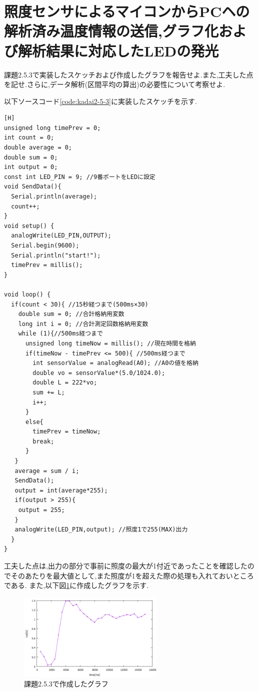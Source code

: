 \documentclass{jarticle}
\begin{document}
\section{照度センサによるマイコンからPCヘの解析済み温度情報の送信,グラフ化および解析結果に対応したLEDの発光}
課題2.5.3で実装したスケッチおよび作成したグラフを報告せよ.また,工夫した点を記せ.さらに,データ解析(区間平均の算出)の必要性について考察せよ.

以下ソースコード\ref{code:kadai2-5-3}に実装したスケッチを示す.
\begin{lstlisting}[caption = 課題2.5.3,label=code:kadai2-5-3][H]
unsigned long timePrev = 0;
int count = 0;
double average = 0;
double sum = 0;
int output = 0;
const int LED_PIN = 9; //9番ポートをLEDに設定
void SendData(){
  Serial.println(average);
  count++;
}
void setup() {
  analogWrite(LED_PIN,OUTPUT);
  Serial.begin(9600);
  Serial.println("start!");
  timePrev = millis();
}

void loop() {
  if(count < 30){ //15秒経つまで(500ms×30)
    double sum = 0; //合計格納用変数
    long int i = 0; //合計測定回数格納用変数
    while (1){//500ms経つまで
      unsigned long timeNow = millis(); //現在時間を格納
      if(timeNow - timePrev <= 500){ //500ms経つまで
        int sensorValue = analogRead(A0); //A0の値を格納
        double vo = sensorValue*(5.0/1024.0);
        double L = 222*vo;
        sum += L;
        i++;
      }
      else{
        timePrev = timeNow;
        break;
      }
   }
   average = sum / i; 
   SendData();
   output = int(average*255);
   if(output > 255){
    output = 255;
   }
   analogWrite(LED_PIN,output); //照度1で255(MAX)出力
  }
}
\end{lstlisting}
工夫した点は,出力の部分で事前に照度の最大が1付近であったことを確認したのでそのあたりを最大値として,また照度が1を超えた際の処理も入れておいところである.
また,以下図\ref{fig:kadai2-5-3}に作成したグラフを示す.

\begin{figure}[H]
\begin{center}
\includegraphics[width=7.0cm]{images/kadai2-5-3.png}
\caption{課題2.5.3で作成したグラフ}
\label{fig:kadai2-5-3}
\end{center}
\end{figure}
\end{document}
